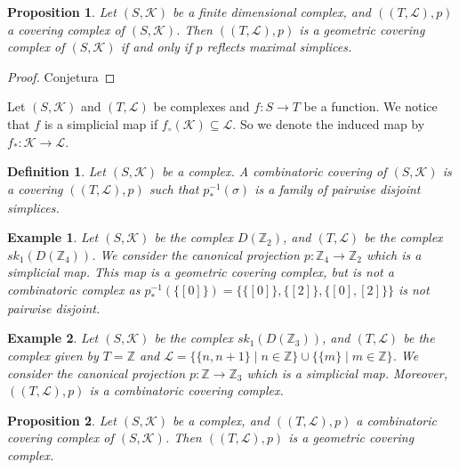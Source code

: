 \documentclass{amsart}
\newtheorem{proposition}{Proposition}[section]
\newtheorem{definition}{Definition}[section]
\newtheorem{example}{Example}[section]
\begin{document}
\begin{proposition}
Let $(S,\mathcal{K})$ be a finite dimensional complex, and $((T,\mathcal{L}),p)$ a covering complex of $(S,\mathcal{K})$. Then $((T,\mathcal{L}),p)$ is a geometric covering complex of $(S,\mathcal{K})$ if and only if $p$ reflects maximal simplices.
\end{proposition}

\begin{proof}
Conjetura
\end{proof}

Let $(S,\mathcal{K})$ and $(T,\mathcal{L})$ be complexes and $f\colon S\longrightarrow T$ be a function. We notice that $f$ is a simplicial map if $f_\circ(\mathcal{K})\subseteq\mathcal{L}$. So we denote the induced map by $f_*\colon \mathcal{K}\longrightarrow\mathcal{L}$.

\begin{definition}
Let $(S,\mathcal{K})$ be a complex. A combinatoric covering of $(S,\mathcal{K})$ is a covering $((T,\mathcal{L}),p)$ such that $p_*^{-1}(\sigma)$ is a family of pairwise disjoint simplices.
\end{definition}

\begin{example}
Let $(S,\mathcal{K})$ be the complex $D(\mathbb{Z}_2)$, and $(T,\mathcal{L})$ be the complex  $sk_1(D(\mathbb{Z}_4))$. We consider the canonical projection $p\colon \mathbb{Z}_4\longrightarrow \mathbb{Z}_2$ which is a simplicial map.  This map is a  geometric covering complex, but is not a combinatoric complex as $p_*^{-1}(\{[0]\})=\{\{[0]\},\{[2]\},\{[0],[2]\}\}$ is not pairwise disjoint.
\end{example}

\begin{example}
Let $(S,\mathcal{K})$ be the complex $sk_1(D(\mathbb{Z}_3))$, and $(T,\mathcal{L})$ be the complex given by $T=\mathbb{Z}$ and $\mathcal{L}=\{\{n,n+1\}\mid n\in\mathbb{Z}\}\cup\{\{m\}\mid m\in\mathbb{Z}\}$. We consider the canonical projection $p\colon \mathbb{Z}\longrightarrow \mathbb{Z}_3$ which is a simplicial map. Moreover,  $((T,\mathcal{L}),p)$ is a combinatoric covering complex.
\end{example}

\begin{proposition}
Let $(S,\mathcal{K})$ be a complex, and $((T,\mathcal{L}),p)$ a combinatoric covering complex of $(S,\mathcal{K})$. Then $((T,\mathcal{L}),p)$ is a geometric covering complex.
\end{proposition}
\end{document}

